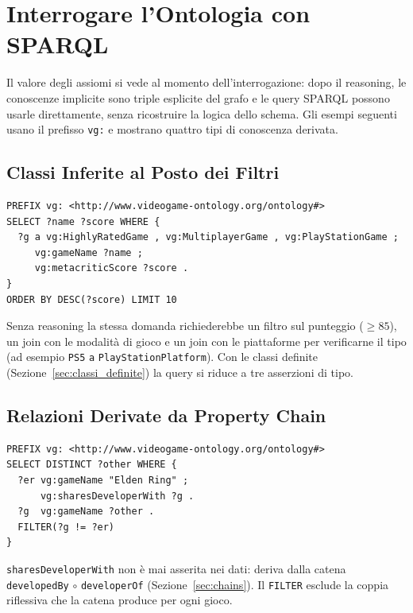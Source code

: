 \section{Interrogare l'Ontologia con SPARQL}
\label{sec:interrogazione}
\sloppy

Il valore degli assiomi si vede al momento dell'interrogazione: dopo il reasoning,
le conoscenze implicite sono triple esplicite del grafo e le query SPARQL possono
usarle direttamente, senza ricostruire la logica dello schema. Gli esempi seguenti
usano il prefisso \texttt{vg:} e mostrano quattro tipi di conoscenza derivata.

\subsection{Classi Inferite al Posto dei Filtri}

\begin{lstlisting}[style=sparql, caption={Giochi multiplayer per PlayStation con punteggio alto}, label={lst:q_classi}]
PREFIX vg: <http://www.videogame-ontology.org/ontology#>
SELECT ?name ?score WHERE {
  ?g a vg:HighlyRatedGame , vg:MultiplayerGame , vg:PlayStationGame ;
     vg:gameName ?name ;
     vg:metacriticScore ?score .
}
ORDER BY DESC(?score) LIMIT 10
\end{lstlisting}

Senza reasoning la stessa domanda richiederebbe un filtro sul punteggio
($\ge 85$), un join con le modalit\`a di gioco e un join con le piattaforme per
verificarne il tipo (ad esempio \texttt{PS5} \texttt{a} \texttt{PlayStationPlatform}). Con le classi definite (Sezione~\ref{sec:classi_definite})
la query si riduce a tre asserzioni di tipo.

\subsection{Relazioni Derivate da Property Chain}

\begin{lstlisting}[style=sparql, caption={Giochi dello stesso sviluppatore di Elden Ring}, label={lst:q_chain}]
PREFIX vg: <http://www.videogame-ontology.org/ontology#>
SELECT DISTINCT ?other WHERE {
  ?er vg:gameName "Elden Ring" ;
      vg:sharesDeveloperWith ?g .
  ?g  vg:gameName ?other .
  FILTER(?g != ?er)
}
\end{lstlisting}

\texttt{sharesDeveloperWith} non \`e mai asserita nei dati: deriva dalla catena
\texttt{developedBy} $\circ$ \texttt{developerOf} (Sezione~\ref{sec:chains}).
Il \texttt{FILTER} esclude la coppia riflessiva che la catena produce per ogni gioco.

